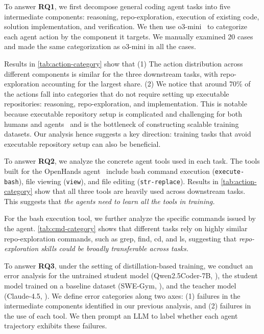 To answer \textbf{RQ1}, we first decompose general coding agent tasks into five intermediate components: reasoning, repo-exploration, execution of existing code, solution implementation, and verification. 
We then use o3-mini~\cite{o3_mini} to categorize each agent action by the component it targets.
We manually examined 20 cases and made the same categorization as o3-mini in all the cases.

Results in \autoref{tab:action-category} show that (1) The action distribution across different components is similar for the three downstream tasks, with repo-exploration accounting for the largest share.
(2) We notice that around 70\% of the actions fall into categories that do not require setting up executable repositories: reasoning, repo-exploration, and implementation.
This is notable because executable repository setup is complicated and challenging for both humans and agents~\cite{swe-smith,swe-play} and is the bottleneck of constructing scalable training datasets.
Our analysis hence suggests a key direction: training tasks that avoid executable repository setup can also be beneficial.


To answer \textbf{RQ2}, we analyze the concrete agent tools used in each task. 
The tools built for the OpenHands agent~\cite{openhands} include bash command execution (\texttt{execute-bash}), file viewing (\texttt{view}), and file editing (\texttt{str-replace}).
Results in \autoref{tab:action-category} show that all three tools are heavily used across downstream tasks. This suggests that \emph{the agents need to learn all the tools in training.}

For the bash execution tool, we further analyze the specific commands issued by the agent. \autoref{tab:cmd-category} shows that different tasks rely on highly similar repo-exploration commands, such as grep, find, cd, and ls, suggesting that \emph{repo-exploration skills could be broadly transferable across tasks.}


To answer \textbf{RQ3}, under the setting of distillation-based training, we conduct an error analysis for the untrained student model (Qwen2.5Coder-7B, \citet{qwen25coder}), the student model trained on a baseline dataset (SWE-Gym, \citet{swegym}), and the teacher model (Claude-4.5, \citet{claude45}).
We define error categories along two axes: (1) failures in the intermediate components identified in our previous analysis, and (2) failures in the use of each tool.
We then prompt an LLM to label whether each agent trajectory exhibits these failures.


